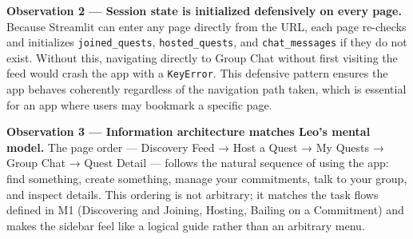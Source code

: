 \documentclass[11pt]{article}
\begin{document}
\textbf{Observation 2 --- Session state is initialized defensively on every page.}
Because Streamlit can enter any page directly from the URL, each page re-checks and initializes \texttt{joined\_quests}, \texttt{hosted\_quests}, and \texttt{chat\_messages} if they do not exist. Without this, navigating directly to Group Chat without first visiting the feed would crash the app with a \texttt{KeyError}. This defensive pattern ensures the app behaves coherently regardless of the navigation path taken, which is essential for an app where users may bookmark a specific page.

\textbf{Observation 3 --- Information architecture matches Leo's mental model.}
The page order --- Discovery Feed → Host a Quest → My Quests → Group Chat → Quest Detail --- follows the natural sequence of using the app: find something, create something, manage your commitments, talk to your group, and inspect details. This ordering is not arbitrary; it matches the task flows defined in M1 (Discovering and Joining, Hosting, Bailing on a Commitment) and makes the sidebar feel like a logical guide rather than an arbitrary menu.
\end{document}
